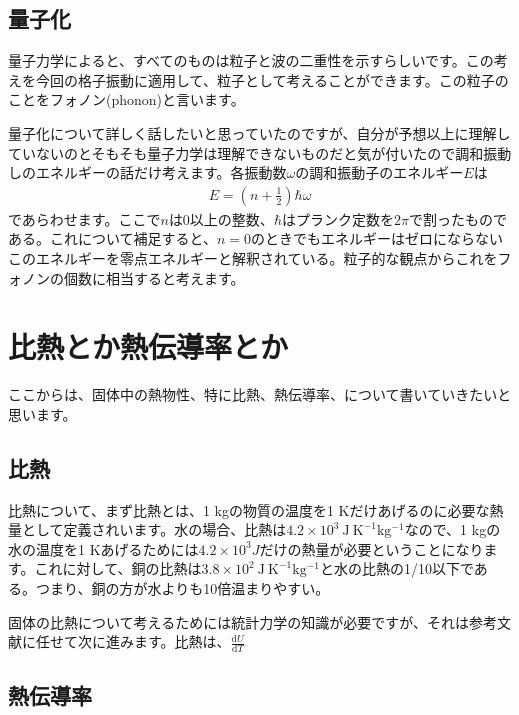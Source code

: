 \documentclass[10pt,b5paper,papersize,dvipdfmx]{jsbook}
\begin{document}
\subsection{量子化}
量子力学によると、すべてのものは粒子と波の二重性を示すらしいです。この考えを今回の格子振動に適用して、粒子として考えることができます。この粒子のことをフォノン(phonon)と言います。\par
量子化について詳しく話したいと思っていたのですが、自分が予想以上に理解していないのとそもそも量子力学は理解できないものだと気が付いたので調和振動しのエネルギーの話だけ考えます。各振動数$\omega$の調和振動子のエネルギー$E$は
\begin{align}
  E = \left(n + \frac{1}{2}\right)\hbar \omega
\end{align}
であらわせます。ここで$n$は0以上の整数、$\hbar$はプランク定数を$2\pi$で割ったものである。これについて補足すると、$n = 0$のときでもエネルギーはゼロにならないこのエネルギーを零点エネルギーと解釈されている。粒子的な観点からこれをフォノンの個数に相当すると考えます。

\section{比熱とか熱伝導率とか}
ここからは、固体中の熱物性、特に比熱、熱伝導率、について書いていきたいと思います。
\subsection{比熱}
比熱について、まず比熱とは、1 kgの物質の温度を1 Kだけあげるのに必要な熱量として定義されいます。水の場合、比熱は$4.2 \times 10^3\  \mathrm{J\ K ^{-1} kg^{-1}}$なので、1 kgの水の温度を1 Kあげるためには$4.2 \times 10^3 J$だけの熱量が必要ということになります。これに対して、銅の比熱は$3.8 \times 10^2\ \mathrm{J\ K ^{-1} kg^{-1}}$と水の比熱の1/10以下である。つまり、銅の方が水よりも10倍温まりやすい。\par
固体の比熱について考えるためには統計力学の知識が必要ですが、それは参考文献に任せて次に進みます。比熱は、$\frac{\mathrm{d}U}{\mathrm{d}T}$
\subsection{熱伝導率}
\end{document}
